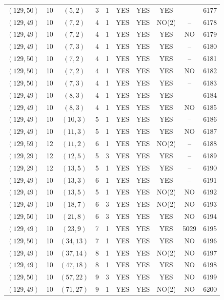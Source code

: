 \begin{longtable}{|c|c|c|c|c|c|c|c|c|c|}
$(129, 50)$ & 10 & $(5, 2)$ & 3 & 1 & YES & YES & YES & -- & 6177\\
$(129, 49)$ & 10 & $(7, 2)$ & 4 & 1 & YES & YES & NO(2) & -- & 6178\\
$(129, 49)$ & 10 & $(7, 2)$ & 4 & 1 & YES & YES & YES & NO & 6179\\
$(129, 49)$ & 10 & $(7, 3)$ & 4 & 1 & YES & YES & YES & -- & 6180\\
$(129, 50)$ & 10 & $(7, 2)$ & 4 & 1 & YES & YES & YES & -- & 6181\\
$(129, 50)$ & 10 & $(7, 2)$ & 4 & 1 & YES & YES & YES & NO & 6182\\
$(129, 50)$ & 10 & $(7, 3)$ & 4 & 1 & YES & YES & YES & -- & 6183\\
$(129, 49)$ & 10 & $(8, 3)$ & 4 & 1 & YES & YES & YES & -- & 6184\\
$(129, 49)$ & 10 & $(8, 3)$ & 4 & 1 & YES & YES & YES & NO & 6185\\
$(129, 49)$ & 10 & $(10, 3)$ & 5 & 1 & YES & YES & YES & -- & 6186\\
$(129, 49)$ & 10 & $(11, 3)$ & 5 & 1 & YES & YES & YES & NO & 6187\\
$(129, 59)$ & 12 & $(11, 2)$ & 6 & 1 & YES & YES & NO(2) & -- & 6188\\
$(129, 29)$ & 12 & $(12, 5)$ & 5 & 3 & YES & YES & YES & -- & 6189\\
$(129, 29)$ & 12 & $(13, 5)$ & 5 & 1 & YES & YES & YES & -- & 6190\\
$(129, 49)$ & 10 & $(13, 3)$ & 6 & 1 & YES & YES & YES & -- & 6191\\
$(129, 49)$ & 10 & $(13, 5)$ & 5 & 1 & YES & YES & NO(2) & NO & 6192\\
$(129, 49)$ & 10 & $(18, 7)$ & 6 & 3 & YES & YES & NO(2) & NO & 6193\\
$(129, 50)$ & 10 & $(21, 8)$ & 6 & 3 & YES & YES & YES & NO & 6194\\
$(129, 49)$ & 10 & $(23, 9)$ & 7 & 1 & YES & YES & YES & 5029 & 6195\\
$(129, 50)$ & 10 & $(34, 13)$ & 7 & 1 & YES & YES & YES & NO & 6196\\
$(129, 49)$ & 10 & $(37, 14)$ & 8 & 1 & YES & YES & NO(2) & NO & 6197\\
$(129, 49)$ & 10 & $(47, 18)$ & 8 & 1 & YES & YES & YES & NO & 6198\\
$(129, 50)$ & 10 & $(57, 22)$ & 9 & 3 & YES & YES & YES & NO & 6199\\
$(129, 49)$ & 10 & $(71, 27)$ & 9 & 1 & YES & YES & NO(2) & NO & 6200\\

\end{longtable}
